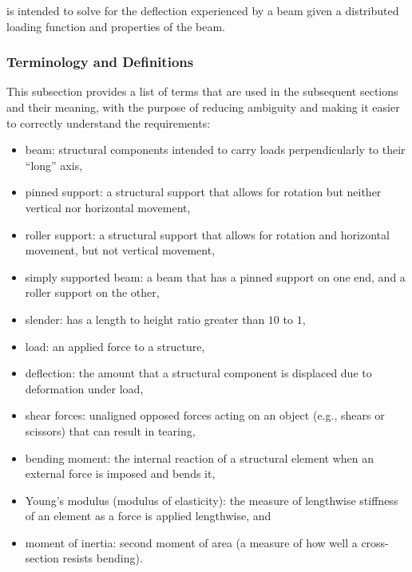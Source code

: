 \documentclass[12pt]{article}
\begin{document}
\progname{} is intended to solve for the deflection experienced by a beam given
a distributed loading function and properties of the beam.

\subsubsection{Terminology and  Definitions}

This subsection provides a list of terms that are used in the subsequent
sections and their meaning, with the purpose of reducing ambiguity and making it
easier to correctly understand the requirements:

\begin{itemize}

    \item beam: structural components intended to carry loads perpendicularly to
          their ``long'' axis\nc{},

    \item pinned support: a structural support that allows for rotation but
          neither vertical nor horizontal movement\nc{},

    \item roller support: a structural support that allows for rotation and
          horizontal movement, but not vertical movement\nc{},

    \item simply supported beam: a beam that has a pinned support on one end,
          and a roller support on the other\nc{},

    \item slender: has a length to height ratio greater than \(10\) to \(1\),

    \item load: an applied force to a structure\nc{},

    \item deflection: the amount that a structural component is displaced due to
          deformation under load\nc{},

    \item shear forces: unaligned opposed forces acting on an object (e.g.,
          shears or scissors) that can result in tearing\nc{},

    \item bending moment: the internal reaction of a structural element when an
          external force is imposed and bends it\nc{},

    \item Young's modulus (modulus of elasticity): the measure of lengthwise
          stiffness of an element as a force is applied lengthwise\nc{}, and

    \item moment of inertia: second moment of area (a measure of how well a
          cross-section resists bending)\cite{SmithAdviceAndDiscussion2023}.

\end{itemize}
\end{document}
